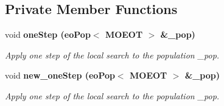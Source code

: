 \subsection*{Private Member Functions}
\begin{CompactItemize}
\item 
void \bf{one\-Step} (eo\-Pop$<$ MOEOT $>$ \&\_\-pop)
\begin{CompactList}\small\item\em Apply one step of the local search to the population \_\-pop. \item\end{CompactList}\item 
void \bf{new\_\-one\-Step} (eo\-Pop$<$ MOEOT $>$ \&\_\-pop)
\begin{CompactList}\small\item\em Apply one step of the local search to the population \_\-pop. \item\end{CompactList}\end{CompactItemize}
